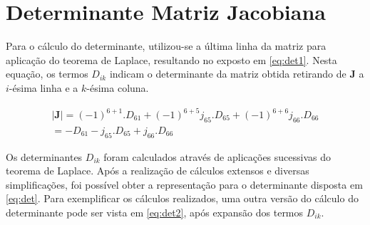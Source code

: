 \section{Determinante Matriz Jacobiana}
\label{AnexoJacobiana-SecDeterminante}

Para o cálculo do determinante, utilizou-se a última linha da matriz para aplicação
do teorema de Laplace, resultando no exposto em \ref{eq:det1}. Nesta equação, os termos
$D_{ik}$ indicam o determinante da matriz obtida retirando de $\textbf{J}$ a $i$-ésima linha e a 
$k$-ésima coluna.

\begin{equation}
\label{eq:det1}
\begin{gathered}
    |\textbf{J}| = (-1)^{6+1}.D_{61} + (-1)^{6+5}j_{65}.D_{65} + (-1)^{6+6}j_{66}.D_{66} \\
    = -D_{61} - j_{65}.D_{65} + j_{66}.D_{66}
\end{gathered}
\end{equation}

Os determinantes $D_{ik}$ foram calculados através de aplicações sucessivas
do teorema de Laplace. Após a realização de cálculos extensos e diversas simplificações,
foi possível obter a representação para o determinante disposta em \ref{eq:det}.
Para exemplificar os cálculos realizados, uma outra versão do cálculo do determinante
pode ser vista em \ref{eq:det2}, após expansão dos termos $D_{ik}$.

\vspace{-1em}

